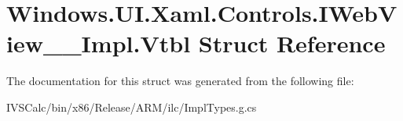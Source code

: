 \hypertarget{struct_windows_1_1_u_i_1_1_xaml_1_1_controls_1_1_i_web_view_____impl_1_1_vtbl}{}\section{Windows.\+U\+I.\+Xaml.\+Controls.\+I\+Web\+View\+\_\+\+\_\+\+Impl.\+Vtbl Struct Reference}
\label{struct_windows_1_1_u_i_1_1_xaml_1_1_controls_1_1_i_web_view_____impl_1_1_vtbl}


The documentation for this struct was generated from the following file\+:\begin{DoxyCompactItemize}
\item 
I\+V\+S\+Calc/bin/x86/\+Release/\+A\+R\+M/ilc/Impl\+Types.\+g.\+cs\end{DoxyCompactItemize}
